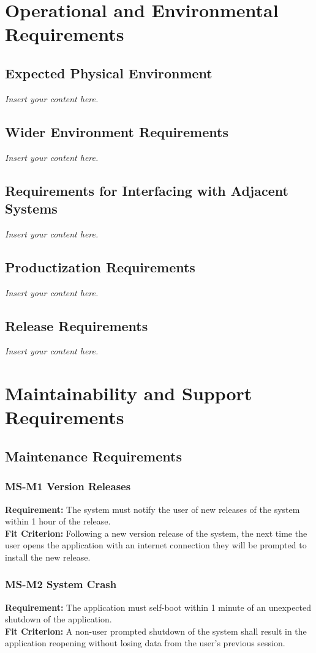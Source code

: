 \documentclass[12pt]{article}
\newcommand{\lips}{\textit{Insert your content here.}}
\begin{document}
\section{Operational and Environmental Requirements}
\subsection{Expected Physical Environment}
\lips
\subsection{Wider Environment Requirements}
\lips
\subsection{Requirements for Interfacing with Adjacent Systems}
\lips
\subsection{Productization Requirements}
\lips
\subsection{Release Requirements}
\lips


\section{Maintainability and Support Requirements}
\subsection{Maintenance Requirements}
\subsubsection*{MS-M1 Version Releases}
\textbf{Requirement:} The system must notify the user of new releases of the system within 1 hour of the release. \\ 
\textbf{Fit Criterion:} Following a new version release of the system, the next time the user opens the application with an internet connection they will be prompted to install the new release. 
\subsubsection*{MS-M2 System Crash}
\textbf{Requirement:} The application must self-boot within 1 minute of an unexpected shutdown of the application. \\ 
\textbf{Fit Criterion:} A non-user prompted shutdown of the system shall result in the application reopening without losing data from the user’s previous session.
\end{document}
